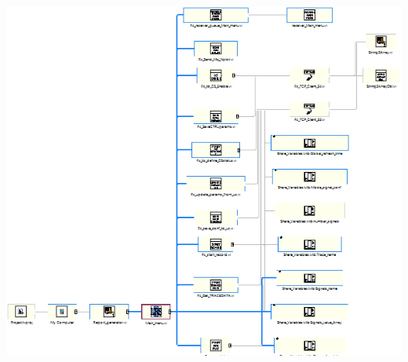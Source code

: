 \documentclass[
]{article}
\begin{document}
\includegraphics{LVtemp20240312184737_17_0h.png}
\end{document}
